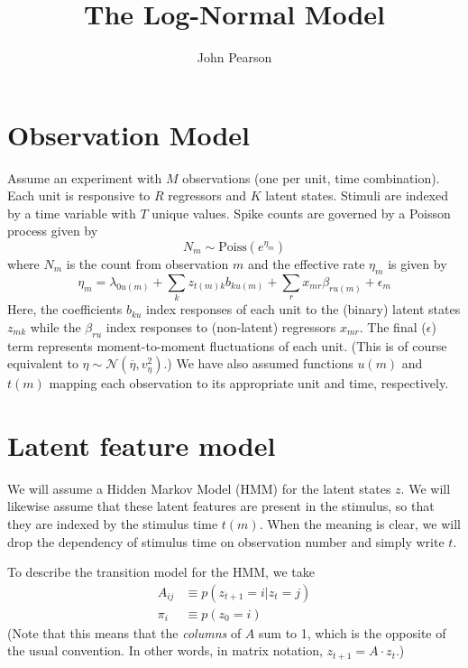 \documentclass[11pt]{article}
\begin{document}
\title{The Log-Normal Model}
\author{John Pearson}
\maketitle

\section{Observation Model}
Assume an experiment with $M$ observations (one per unit, time combination). Each unit is responsive to $R$ regressors and $K$ latent states. Stimuli are indexed by a time variable with $T$ unique values. Spike counts are governed by a Poisson process given by
\begin{equation}
    N_{m} \sim \mathrm{Poiss}(e^{\eta_{m}}) 
\end{equation}
where $N_{m}$ is the count from observation $m$ and the effective rate $\eta_{m}$ is given by 
\begin{equation}
    \label{loglambda}
    \eta_m = \lambda_{0u(m)} + \sum_k z_{t(m)k} b_{ku(m)} + \sum_r x_{mr} \beta_{ru(m)} + \epsilon_{m}
\end{equation}
Here, the coefficients $b_{ku}$ index responses of each unit to the (binary) latent states $z_{mk}$ while the $\beta_{ru}$ index responses to (non-latent) regressors $x_{mr}$. The final ($\epsilon$) term represents moment-to-moment fluctuations of each unit. (This is of course equivalent to $\eta \sim \mathcal{N}(\overline{\eta}, v^2_\eta)$.) We have also assumed functions $u(m)$ and $t(m)$ mapping each observation to its appropriate unit and time, respectively.

\section{Latent feature model}
We will assume a Hidden Markov Model (HMM) for the latent states $z$. We will likewise assume that these latent features are present in the stimulus, so that they are indexed by the stimulus time $t(m)$. When the meaning is clear, we will drop the dependency of stimulus time on observation number and simply write $t$.

To describe the transition model for the HMM, we take
\begin{align}
    A_{ij} &\equiv p(z_{t+1} = i|z_t = j) \\
    \pi_i &\equiv p(z_0 = i)
\end{align}
(Note that this means that the \emph{columns} of $A$ sum to 1, which is the opposite of the usual convention. In other words, in matrix notation, $z_{t+1} = A \cdot z_t$.)
\end{document}
